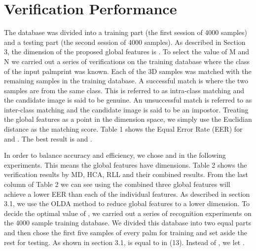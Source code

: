 \section{Verification Performance}
\label{sec:experiment:verification}

The database was divided into a training part (the first session of 4000 samples) and a testing part (the second session of 4000 samples). As described in Section 3, the dimension of the proposed global features is  . To select the value of M and N we carried out a series of verifications on the training database where the class of the input palmprint was known. Each of the 3D samples was matched with the remaining samples in the training database. A successful match is where the two samples are from the same class. This is referred to as intra-class matching and the candidate image is said to be genuine. An unsuccessful match is referred to as inter-class matching and the candidate image is said to be an impostor. Treating the global features as a point in the   dimension space, we simply use the Euclidian distance as the matching score. Table 1 shows the Equal Error Rate (EER) for   and  . The best result is   and  .

In order to balance accuracy and efficiency, we chose   and   in the following experiments. This means the global features have   dimensions. Table 2 shows the verification results by MD, HCA, RLL and their combined results. From the last column of Table 2 we can see using the combined three global features will achieve a lower EER than each of the individual features. As described in section 3.1, we use the OLDA method to reduce global features to a lower   dimension. To decide the optimal value of  , we carried out a series of recognition experiments on the 4000 sample training database. We divided this database into two equal parts and then chose the first five samples of every palm for training and set aside the rest for testing. As shown in section 3.1,   is equal to   in (13). Instead of  , we let  .